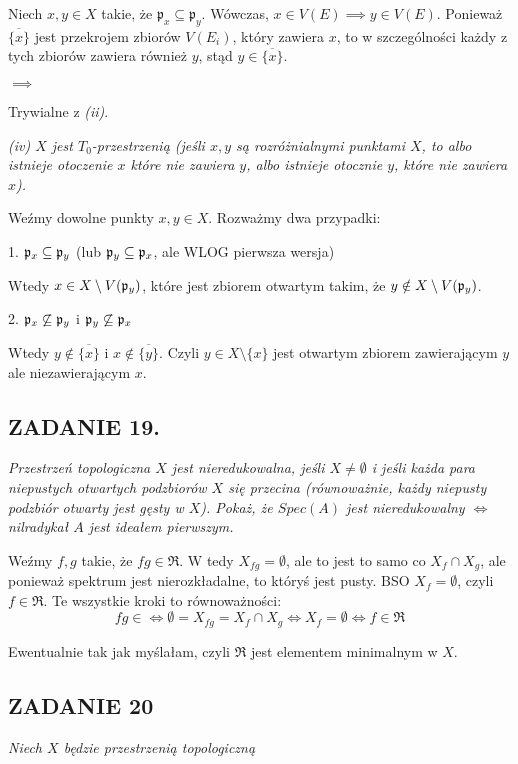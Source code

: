 \documentclass{article}
\begin{document}
Niech $x,y\in X$ takie, że $\mathfrak{p}_x\subseteq\mathfrak{p}_y$. Wówczas, $x\in V(E)\implies y\in V(E)$. Ponieważ $\overline{\{x\}}$ jest przekrojem zbiorów $V(E_i)$, który zawiera $x$, to w szczególności każdy z tych zbiorów zawiera również $y$, stąd $y\in\overline{\{x\}}$.

$\implies$

Trywialne z \emph{(ii)}.
\medskip

\emph{\color{pink}(iv) $X$ jest $T_0$-przestrzenią (jeśli $x,y$ są rozróżnialnymi punktami $X$, to albo istnieje otoczenie $x$ które nie zawiera $y$, albo istnieje otocznie $y$, które nie zawiera $x$).}

Weźmy dowolne punkty $x,y\in X$. Rozważmy dwa przypadki:

1. $\mathfrak{p}_x\subseteq\mathfrak{p}_y$ (lub $\mathfrak{p}_y\subseteq\mathfrak{p}_x$, ale WLOG pierwsza wersja)

Wtedy $x\in X\setminus V(\mathfrak{p}_y)$, które jest zbiorem otwartym takim, że $y\notin X\setminus V(\mathfrak{p}_y)$.

2. $\mathfrak{p}_x\not\subseteq\mathfrak{p}_y$ i $\mathfrak{p}_y\not\subseteq\mathfrak{p}_x$

Wtedy $y\notin\overline{\{x\} }$ i $x\notin\overline{\{y\} }$. Czyli $y\in X\setminus\{x\}$ jest otwartym zbiorem zawierającym $y$ ale niezawierającym $x$.

\subsection*{ZADANIE 19.}
\emph{\color{pink}Przestrzeń topologiczna $X$ jest nieredukowalna, jeśli $X\neq\emptyset$ i jeśli każda para niepustych otwartych podzbiorów $X$ się przecina (równoważnie, każdy niepusty podzbiór otwarty jest gęsty w $X$). Pokaż, że $Spec(A)$ jest nieredukowalny $\iff$ nilradykał $A$ jest ideałem pierwszym.}

Weźmy $f,g$ takie, że $fg\in\mathfrak{R}$. W tedy $X_{fg}=\emptyset$, ale to jest to samo co $X_f\cap X_g$, ale ponieważ spektrum jest nierozkładalne, to któryś jest pusty. BSO $X_f=\emptyset$, czyli $f\in\mathfrak{R}$. Te wszystkie kroki to równoważności:
$$fg\in\mathfrak\iff \emptyset=X_{fg}=X_f\cap X_g\iff X_f=\emptyset\iff f\in\mathfrak{R}$$

Ewentualnie tak jak myślałam, czyli $\mathfrak{R}$ jest elementem minimalnym w $X$.

\subsection*{ZADANIE 20}
\emph{\color{pink}Niech $X$ będzie przestrzenią topologiczną}
\end{document}
